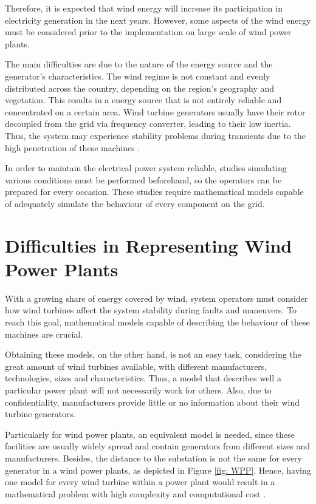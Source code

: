 Therefore, it is expected that wind energy will increase its participation in electricity generation in the next years. However, some aspects of the wind energy must be considered prior to the implementation on large scale of wind power plants.

The main difficulties are due to the nature of the energy source and the generator's characteristics. The wind regime is not constant and evenly distributed across the country, depending on the region's geography and vegetation. This results in a energy source that is not entirely reliable and concentrated on a certain area. Wind turbine generators usually have their rotor decoupled from the grid via frequency converter, leading to their low inertia. Thus, the system may experience stability problems during transients due to the high penetration of these machines \cite{Xiong2019}.

In order to maintain the electrical power system reliable, studies simulating various conditions must be performed beforehand, so the operators can be prepared for every occasion. These studies require mathematical models capable of adequately simulate the behaviour of every component on the grid.

\section{Difficulties in Representing Wind Power Plants}

With a growing share of energy covered by wind, system operators must consider how wind turbines affect the system stability during faults and maneuvers. To reach this goal, mathematical models capable of describing the behaviour of these machines are crucial. 

Obtaining these models, on the other hand, is not an easy task, considering the great amount of wind turbines available, with different manufacturers, technologies, sizes and characteristics. Thus, a model that describes well a particular power plant will not necessarily work for others. Also, due to confidentiality, manufacturers provide little or no information about their wind turbine generators. 

Particularly for wind power plants, an equivalent model is needed, since these facilities are usually widely spread and contain generators from different sizes and manufacturers. Besides, the distance to the substation is not the same for every generator in a wind power plants, as depicted in Figure \ref{fig: WPP}. Hence, having one model for every wind turbine within a power plant would result in a mathematical problem with high complexity and computational cost \cite{Erlich2012}.

